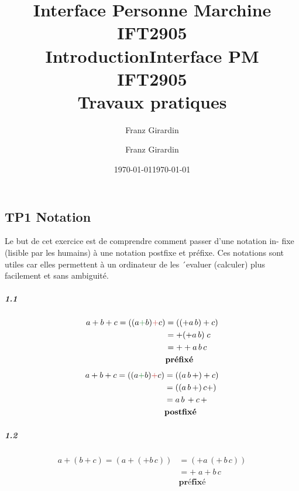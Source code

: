 \documentclass{report}
\title{\Huge{Interface Personne Marchine}\\{IFT2905}\\{\textbf{Introduction}}}
\author{\huge{Franz Girardin}}
\date{\today}
\title{\Huge{Interface PM}\\{IFT2905}\\{\textbf{Travaux pratiques}}}
\author{\huge{Franz Girardin}}
\date{\today}
\begin{document}
\maketitle
\pagebreak
\tableofcontents
\pagebreak

\begin{multicols*}{3}
\chapter{TP1 Notation} 

    \footnotesize

\begin{Exercice}{}{}
Le but de cet exercice est de comprendre comment passer d’une notation in-
fixe (lisible par les humains) à une notation postfixe et préfixe. Ces notations
sont utiles car elles permettent à un ordinateur de les ´evaluer (calculer) plus
facilement et sans ambiguité.   
\end{Exercice}

\paragraph{1.1}



\begin{align*}
    a + b + c = ((a \textcolor{myg}{+}   b) \textcolor{myr}{+}   c) 
             &= ((+ a \, b) + c) \\ 
             &= + (+ a \, b) \; c \\ 
             &= + + a \, b \, c \; 
             \\
             & \textbf{préfixé}  
\end{align*}
\begin{align*}
    a + b + c = ((a \textcolor{myg}{+}   b) \textcolor{myr}{+}   c)           
    &= ((a \, b \, +) + c) \\
    &= ((a \, b \, +) \, c +) \\ 
    &=  a \, b \, + c \, + \\
    & \textbf{postfixé}
\end{align*}


\paragraph{1.2}
\begin{align*}
    a + (b + c) = (a + (+ b \, c)) 
             &= ( + a \, (+ \, b \, c) ) \\
             &= + \; a  +  b \, c \\
             & \textbf{préfixé}  
\end{align*}



\end{multicols*}
\end{document}
